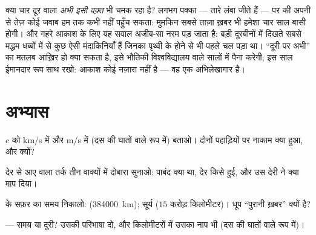 \begin{remark}[वहाँ ``अभी'' का मतलब क्या है]\label{rem:g8:speed-of-light:now}
क्या चार  दूर वाला  \emph{अभी इसी वक़्त} भी चमक रहा है?
लगभग पक्का --- तारे लंबा जीते हैं --- पर  की अपनी  से तेज़
कोई जवाब हम तक कभी नहीं पहुँच सकता: मुमकिन सबसे ताज़ा ख़बर भी हमेशा
चार साल बासी होगी। और गहरे आकाश के लिए यह सवाल अजीब-सा नरम पड़ जाता
है: बड़ी दूरबीनों में दिखते सबसे मद्धम धब्बों में से कुछ ऐसी मंदाकिनियाँ
हैं जिनका  पृथ्वी के होने से भी पहले चल पड़ा था। ``दूरी पर अभी''
का मतलब आख़िर हो क्या सकता है, इसे भौतिकी विश्वविद्यालय वाले सालों में
पैना करेगी; इस साल ईमानदार रूप साथ रखो: आकाश कोई नज़ारा नहीं है ---
वह एक अभिलेखागार है।
\end{remark}

\section{अभ्यास}

\begin{exercise}[$\star$]\label{exo:g8:speed-of-light:1}
$c$ को \unit{km/s} में और \unit{m/s} में (दस की घातों वाले रूप में)
बताओ। दोनों पहाड़ियों पर नाकाम क्या हुआ, और क्यों?
\end{exercise}

\begin{exercise}[$\star$]\label{exo:g8:speed-of-light:2}
देर से आए  वाला तर्क तीन वाक्यों में दोबारा सुनाओ: पाबंद क्या
था, देर किसे हुई, और उस देरी ने क्या माप दिया।
\end{exercise}

\begin{exercise}[$\star$]\label{exo:g8:speed-of-light:3}
 के सफ़र का समय निकालो:  (\qty{384000}{km}); सूर्य ($15$
करोड़ किलोमीटर)। धूप ``पुरानी ख़बर'' क्यों है?
\end{exercise}

\begin{exercise}[$\star$]\label{exo:g8:speed-of-light:4}
 --- समय या दूरी? उसकी परिभाषा दो, और किलोमीटरों में उसका
नाप भी (दस की घातों वाले रूप में)।
\end{exercise}

